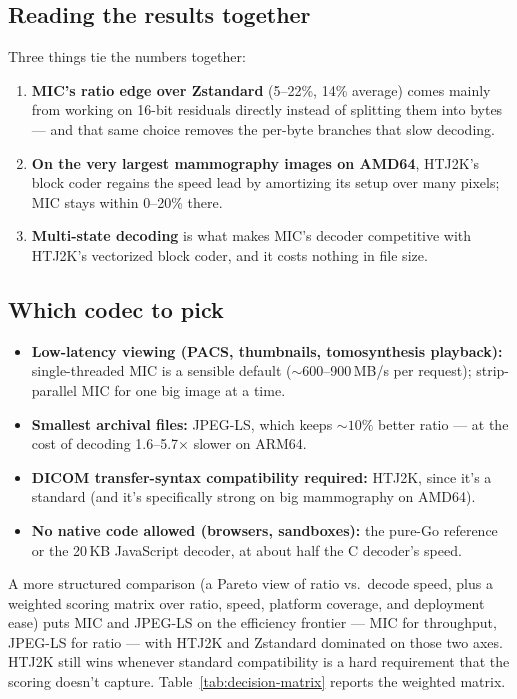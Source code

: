 \documentclass[11pt]{article}
\begin{document}
\subsection{Reading the results together}

Three things tie the numbers together:

\begin{enumerate}
  \item \textbf{MIC's ratio edge over Zstandard} (5--22\%, 14\% average) comes
  mainly from working on 16-bit residuals directly instead of splitting them
  into bytes --- and that same choice removes the per-byte branches that slow
  decoding.
  \item \textbf{On the very largest mammography images on AMD64}, HTJ2K's block
  coder regains the speed lead by amortizing its setup over many pixels; MIC
  stays within 0--20\% there.
  \item \textbf{Multi-state decoding} is what makes MIC's decoder competitive
  with HTJ2K's vectorized block coder, and it costs nothing in file size.
\end{enumerate}

\subsection{Which codec to pick}

\begin{itemize}
  \item \textbf{Low-latency viewing (PACS, thumbnails, tomosynthesis
  playback):} single-threaded MIC is a sensible default (${\sim}600$--900\,MB/s
  per request); strip-parallel MIC for one big image at a time.
  \item \textbf{Smallest archival files:} JPEG-LS, which keeps ${\sim}10\%$
  better ratio --- at the cost of decoding 1.6--5.7$\times$ slower on ARM64.
  \item \textbf{DICOM transfer-syntax compatibility required:} HTJ2K, since
  it's a standard (and it's specifically strong on big mammography on AMD64).
  \item \textbf{No native code allowed (browsers, sandboxes):} the pure-Go
  reference or the 20\,KB JavaScript decoder, at about half the C decoder's
  speed.
\end{itemize}

A more structured comparison (a Pareto view of ratio vs.\ decode speed, plus a
weighted scoring matrix over ratio, speed, platform coverage, and deployment
ease) puts MIC and JPEG-LS on the efficiency frontier --- MIC for throughput,
JPEG-LS for ratio --- with HTJ2K and Zstandard dominated on those two axes.
HTJ2K still wins whenever standard compatibility is a hard requirement that
the scoring doesn't capture. Table~\ref{tab:decision-matrix} reports the
weighted matrix.
\end{document}
